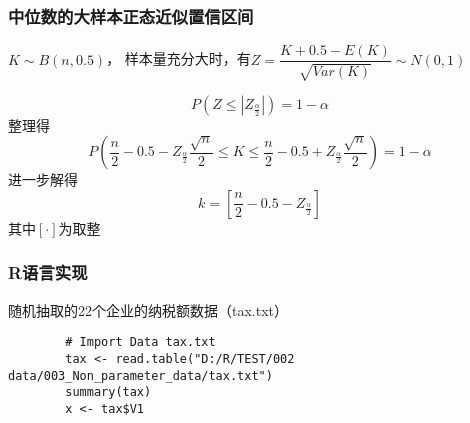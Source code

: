 \documentclass[UTF8]{ctexart}
\numberwithin{equation}{section}
\begin{document}
\subsubsection{中位数的大样本正态近似置信区间}
$K \sim B(n,0.5)$，
样本量充分大时，有$Z = \dfrac{K + 0.5 - E(K)}{\sqrt{Var(K)}} \sim N(0, 1)$

\begin{equation}
    P(Z \leq |Z_{\frac{\alpha}{2}}|) = 1 - \alpha
\end{equation}
整理得
\begin{equation}
    P(\dfrac{n}{2} - 0.5 - Z_{\frac{\alpha}{2}} \dfrac{\sqrt{n}}{2} \leq K \leq \dfrac{n}{2} - 0.5 + Z_{\frac{\alpha}{2}} \dfrac{\sqrt{n}}{2}) = 1 - \alpha
\end{equation}
进一步解得
\begin{equation}
    k = [\dfrac{n}{2} - 0.5 - Z_{\frac{\alpha}{2}}]
\end{equation}
其中$[·]$为取整

\subsubsection{R语言实现}

随机抽取的22个企业的纳税额数据（tax.txt）
\begin{center}
    \begin{lstlisting}
        # Import Data tax.txt
        tax <- read.table("D:/R/TEST/002 data/003_Non_parameter_data/tax.txt")
        summary(tax)
        x <- tax$V1
    \end{lstlisting}
\end{center}
\end{document}
